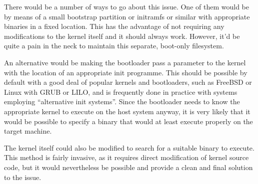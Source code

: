 \documentclass[a4paper,twoside,titlepage]{article}
\begin{document}
There would be a number of ways to go about this issue. One of them would be
by means of a small bootstrap partition or initramfs or similar with appropriate
binaries in a fixed location. This has the advantage of not requiring any
modifications to the kernel itself and it should always work. However, it'd be
quite a pain in the neck to maintain this separate, boot-only filesystem.

An alternative would be making the bootloader pass a parameter to the kernel
with the location of an appropriate init programme. This should be possible by
default with a good deal of popular kernels and bootloaders, such as FreeBSD or
Linux with GRUB or LILO, and is frequently done in practice with systems
employing ``alternative init systems''. Since the bootloader needs to know the
appropriate kernel to execute on the host system anyway, it is very likely that
it would be possible to specify a binary that would at least execute properly on
the target machine.

The kernel itself could also be modified to search for a suitable binary to
execute. This method is fairly invasive, as it requires direct modification of
kernel source code, but it would nevertheless be possible and provide a clean and
final solution to the issue.

\newpage

\begin{thebibliography}{alpha}

\end{thebibliography}
\end{document}
